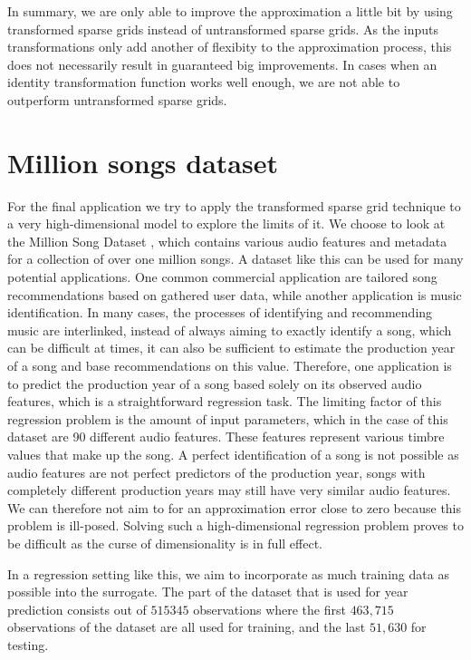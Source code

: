 \documentclass[
  a4paper,  %
  twoside,  %
  bibliography=totoc,
  headsepline,
  cleardoublepage=empty,
  parskip=half,
  draft=false
]{scrbook}
\begin{document}
In summary, we are only able to improve the approximation a little bit by using transformed sparse grids instead of untransformed sparse grids.
As the inputs transformations only add another of flexibity to the approximation process, this does not necessarily result in guaranteed big improvements.
In cases when an identity transformation function works well enough, we are not able to outperform untransformed sparse grids.

\section{Million songs dataset}

For the final application we try to apply the transformed sparse grid technique to a very high-dimensional model to explore the limits of it.
We choose to look at the Million Song Dataset \cite{BertinMahieux2011}, which contains various audio features and metadata for a collection of over one million songs.
A dataset like this can be used for many potential applications.
One common commercial application are tailored song recommendations based on gathered user data, while another application is music identification.
In many cases, the processes of identifying and recommending music are interlinked, \ie instead of always aiming to exactly identify a song, which can be difficult at times, it can also be sufficient to estimate the production year of a song and base recommendations on this value.
Therefore, one application is to predict the production year of a song based solely on its observed audio features, which is a straightforward regression task.
The limiting factor of this regression problem is the amount of input parameters, which in the case of this dataset are 90 different audio features.
These features represent various timbre values that make up the song.
A perfect identification of a song is not possible as audio features are not perfect predictors of the production year, \ie songs with completely different production years may still have very similar audio features.
We can therefore not aim to for an approximation error close to zero because this problem is ill-posed.
Solving such a high-dimensional regression problem proves to be difficult as the curse of dimensionality is in full effect.

In a regression setting like this, we aim to incorporate as much training data as possible into the surrogate.
The part of the dataset that is used for year prediction consists out of $515345$ observations where the first $463,715$ observations of the dataset are all used for training, and the last $51,630$ for testing.
\end{document}
